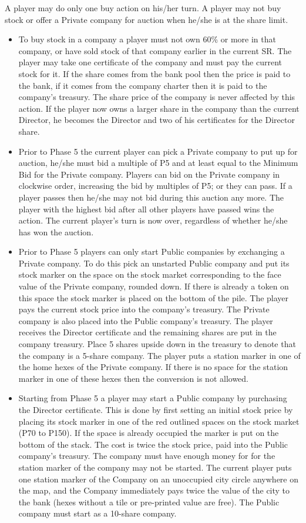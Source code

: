 \documentclass[a4paper,twocolumn]{article}
\begin{document}
A player may do only one buy action on his/her turn. A player may not buy stock
or offer a Private company for auction when he/she is at the share limit.
\begin{itemize}
	\item To buy stock in a company a player must not own 60\% or more in that
	company, or have sold stock of that company earlier in the current SR. The
	player may take one certificate of the company and must pay the current
	stock for it. If the share comes from the bank pool then the price is paid
	to the bank, if it comes from the company charter then it is paid to the
	company's treasury. The share price of the company is never affected by this
	action. If the player now owns a larger share in the company than the
	current Director, he becomes the Director and two of his certificates for
	the Director share.
	\item Prior to Phase 5 the current player can pick a Private company to put
	up for auction, he/she must bid a multiple of P5 and at least equal to the
	Minimum Bid for the Private company. Players can bid on the Private company
	in clockwise order, increasing the bid by multiples of P5; or they can pass.
	If a player passes then he/she may not bid during this auction any more.
	The player with the highest bid after all other players have passed wins
	the action. The current player's turn is now over, regardless of whether
	he/she has won the auction.
	\item Prior to Phase 5 players can only start Public companies by exchanging
	a Private company. To do this pick an unstarted Public company and put its
	stock marker on the space on the stock market corresponding to the face
	value of the Private company, rounded down. If there is already a token on
	this space the stock marker is placed on the bottom of the pile. The player
	pays the current stock price into the company's treasury. The Private
	company is also placed into the Public company's treasury. The player
	receives the Director certificate and the remaining shares are put in the
	company treasury. Place 5 shares upside down in the treasury to denote that
	the company is a 5-share company. The player puts a station marker in one
	of the home hexes of the Private company. If there is no space for the
	station marker in one of these hexes then the conversion is not allowed.
	\item Starting from Phase 5 a player may start a Public company by
	purchasing the Director certificate. This is done by first setting an
	initial stock price by placing its stock marker in one of the red outlined
	spaces on the stock market (P70 to P150). If the space is already occupied
	the marker is put on the bottom of the stack. The cost is twice the stock
	price, paid into the Public company's treasury. The company must have enough
	money for for the station marker of the company may not be started. The
	current player puts one station marker of the Company on an unoccupied city
	circle anywhere on the map, and the Company immediately pays twice the value
	of the city to the bank (hexes without a tile or pre-printed value are
	free). The Public company must start as a 10-share company.
\end{itemize}
\end{document}
